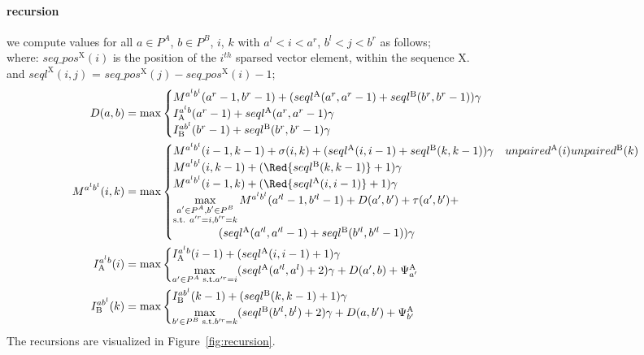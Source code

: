 \documentclass{article}
\newcommand{\DTmat}[2]{D(#1,#2)}
\newcommand{\MTmat}[4]{M^{{#1}^l {#2}^l}(#3,#4)}
\newcommand{\IATmat}[3]{I^{{#1}^l {#2}}_\textrm{A}(#3)}
\newcommand{\IBTmat}[3]{I^{{#1} {#2}^l}_\textrm{B}(#3)}
\newcommand{\numPos}[3]{seql^\textrm{#1}(#2,#3)}
\newcommand{\numPosA}[2]{\numPos{A}{#1}{#2}}
\newcommand{\numPosB}[2]{\numPos{B}{#1}{#2}}
\newcommand{\seqPos}[2]{seq\_pos^\textrm{#1}(#2)}
\newcommand{\unpairedA}[1]{unpaired^\textrm{A}{(#1)}}
\newcommand{\unpairedB}[1]{unpaired^\textrm{B}{(#1)}}
\newcommand{\PsiA}[1]{\Psi^\textrm{A}_{#1}}
\begin{document}
\paragraph{recursion}
we compute values for all $a\in P^A$, $b\in P^B$, $i$, $k$
with $a^l<i<a^r$, $b^l<j<b^r$ as follows;\\ 
where:  $\seqPos{X}{i}$ is the position of the $i^{th}$ sparsed vector element, within the sequence X.\\
and $\numPos{X}{i}{j}$ = $\seqPos{X}{j} - \seqPos{X}{i} -1$;
\begin{align}
  \DTmat{a}{b} &= \max
  \begin{cases}
    \MTmat{a}{b}{a^r-1}{b^r-1} + (\numPosA{a^r}{a^r-1} + \numPosB{b^r}{b^r-1})\gamma\\
    \IATmat{a}{b}{a^r-1} + \numPosA{a^r}{a^r-1}\gamma\\
    \IBTmat{a}{b}{b^r-1} + \numPosB{b^r}{b^r-1}\gamma
  \end{cases}\label{recursionD}\\
  \MTmat{a}{b}{i}{k} &= \max
  \begin{cases}
    \MTmat{a}{b}{i-1}{k-1} + \sigma(i,k) + (\numPosA{i}{i-1} + \numPosB{k}{k-1})\gamma & \unpairedA{i} \unpairedB{k}\\
    \MTmat{a}{b}{i}{k-1} + (\Red{\numPosB{k}{k-1}}+1)\gamma \\
    \MTmat{a}{b}{i-1}{k} + (\Red{\numPosA{i}{i-1}}+1)\gamma \\
    \max_{\substack{a'\in P^A,b'\in P^B\\\text{s.t. } a'^r=i, b'^r=k}}\limits \MTmat{a}{b}{a'^l-1}{b'^l-1} + \DTmat{a'}{b'} + \tau(a',b') + \\ \qquad\qquad (\numPosA{a'^l}{a'^l-1} + \numPosB{b'^l}{b'^l-1})\gamma
  \end{cases}\label{recursionM}\\
  \IATmat{a}{b}{i} &= \max
  \begin{cases}
    \IATmat{a}{b}{i-1} + (\numPosA{i}{i-1} + 1)\gamma\\
    \max_{a'\in P^A\text{ s.t.} a'^r=i}\limits (\numPosA{a'^l}{a^l}+2)\gamma + \DTmat{a'}{b} +  \PsiA{a'}
  \end{cases}\label{recursionIA}\\
  \IBTmat{a}{b}{k} &= \max
  \begin{cases}
    \IBTmat{a}{b}{k-1} + (\numPosB{k}{k-1} + 1)\gamma\\
    \max_{b'\in P^B\text{ s.t.} b'^r=k}\limits (\numPosB{b'^l}{b^l}+2)\gamma +
    \DTmat{a}{b'} + \PsiA{b'}
  \end{cases}\label{recursionIB}
\end{align}
The recursions are visualized in Figure~\ref{fig:recursion}.
\end{document}
